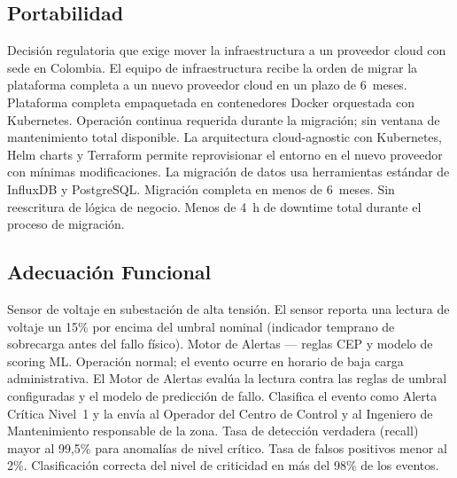 \documentclass[12pt, letterpaper]{article}
\begin{document}
\subsection{Portabilidad}

  {Decisión regulatoria que exige mover la infraestructura a un proveedor cloud con
   sede en Colombia.}
  {El equipo de infraestructura recibe la orden de migrar la plataforma completa a un
   nuevo proveedor cloud en un plazo de 6~meses.}
  {Plataforma completa empaquetada en contenedores Docker orquestada con Kubernetes.}
  {Operación continua requerida durante la migración; sin ventana de mantenimiento
   total disponible.}
  {La arquitectura cloud-agnostic con Kubernetes, Helm charts y Terraform permite
   reprovisionar el entorno en el nuevo proveedor con mínimas modificaciones. La
   migración de datos usa herramientas estándar de InfluxDB y PostgreSQL.}
  {Migración completa en menos de 6~meses. Sin reescritura de lógica de negocio. Menos
   de 4~h de downtime total durante el proceso de migración.}

\subsection{Adecuación Funcional}

  {Sensor de voltaje en subestación de alta tensión.}
  {El sensor reporta una lectura de voltaje un 15\% por encima del umbral nominal
   (indicador temprano de sobrecarga antes del fallo físico).}
  {Motor de Alertas --- reglas CEP y modelo de scoring ML.}
  {Operación normal; el evento ocurre en horario de baja carga administrativa.}
  {El Motor de Alertas evalúa la lectura contra las reglas de umbral configuradas y el
   modelo de predicción de fallo. Clasifica el evento como Alerta Crítica Nivel~1 y
   la envía al Operador del Centro de Control y al Ingeniero de Mantenimiento
   responsable de la zona.}
  {Tasa de detección verdadera (recall) mayor al 99,5\% para anomalías de nivel
   crítico. Tasa de falsos positivos menor al 2\%. Clasificación correcta del nivel de
   criticidad en más del 98\% de los eventos.}

\end{document}
